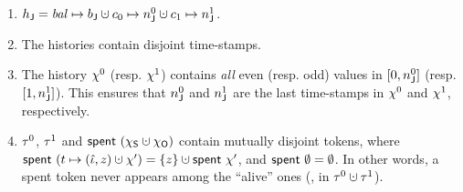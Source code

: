 \begin{enumerate}[label=(\roman*)]

%


\item\label{cn:state} $\heapj = \bal \mapsto b_\joint \hunion c_0 \mapsto n^0_\joint
  \hunion c_1 \mapsto n^1_\joint$.

\item\label{cn:hvalid} The histories contain disjoint time-stamps. %
 

\item\label{cn:ci} 
%
  The history $\chi^0$ (resp. $\chi^1$) contains \emph{all} even
  (resp. odd) values in $[0, n^0_{\mathsf{J}}]$ (resp. $[1, n^1_{\mathsf{J}}]$).
%
%
    This ensures that $n^0_{\mathsf{J}}$ and $n^1_{\mathsf{J}}$ are the last
    time-stamps in $\chi^0$ and $\chi^1$, respectively.

\item\label{cn:ti}  
%
  $\tau^0$, $\tau^1$ and $\Tomb~(\hists \hunion \histo)$ contain
  mutually disjoint tokens, where $\Tomb~(t \mapsto (\tknh, z) \hunion
  \hist') = \{z\} \hunion \Tomb~\hist'$, and $\mathsf{spent}~\emptyset =
  \emptyset$. In other words, a spent token never appears among the
  ``alive'' ones (\ie, in $\tkn^0 \hunion \tkn^1$).


\end{enumerate}
